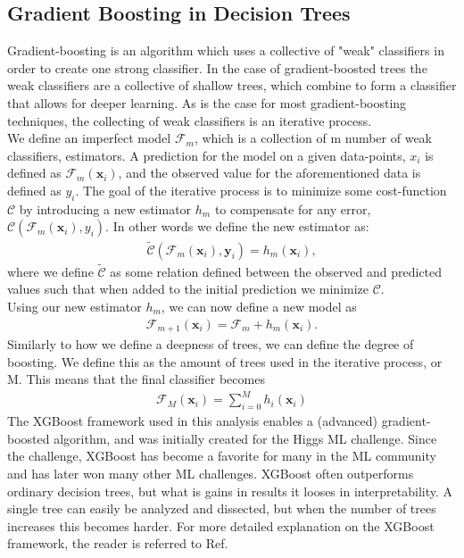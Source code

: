 \subsection{Gradient Boosting in Decision Trees}
Gradient-boosting is an algorithm which uses a collective of "weak" 
classifiers in order to create one strong classifier. In the case of gradient-boosted 
trees the weak classifiers are a collective of shallow trees, which combine to form a classifier 
that allows for deeper learning. As is the case for most gradient-boosting 
techniques, the collecting of weak classifiers is an iterative process.
\\
We define an imperfect model $\mathcal{F}_m$, which is a collection of m number of weak 
classifiers, estimators. A prediction for the model on a given data-points, $x_i$ is 
defined as $\mathcal{F}_m(\textbf{x}_i)$, and the observed value for the aforementioned data is 
defined as $y_i$. The goal of the iterative process is to minimize some cost-function 
$\mathcal{C}$ by introducing a new estimator $h_m$ to compensate for any error, 
$\mathcal{C}(\mathcal{F}_m(\textbf{x}_i), y_i)$. In other words we define the new estimator as:
\begin{align}
    \tilde{\mathcal{C}}(\mathcal{F}_m(\textbf{x}_i), \textbf{y}_i) = h_m(\textbf{x}_i),
\end{align}
where we define $\tilde{\mathcal{C}}$ as some relation defined between the observed and 
predicted values such that when added to the initial prediction we minimize $\mathcal{C}$.
\\
Using our new estimator $h_m$, we can now define a new model as
\begin{align}
    \mathcal{F}_{m+1}(\textbf{x}_i) = \mathcal{F}_m + h_m (\textbf{x}_i).
\end{align}
Similarly to how we define a deepness of trees, we can define the degree of boosting. We define 
this as the amount of trees used in the iterative process, or M. This means that the final classifier 
becomes
\begin{align}
    \mathcal{F}_M (\textbf{x}_i) = \sum_{i=0}^M h_i(\textbf{x}_i)
\end{align} 
The XGBoost \cite{XGB} framework used in this analysis enables a (advanced) gradient-boosted algorithm, 
and was initially created for the Higgs ML challenge. Since the challenge, XGBoost has become 
a favorite for many in the ML community and has later won many other ML challenges. XGBoost 
often outperforms ordinary decision trees, but what is gains in results it looses in 
interpretability. A single tree can easily be analyzed and dissected, but when the number 
of trees increases this becomes harder. For more detailed explanation on the XGBoost framework,
the reader is referred to Ref.\cite{XGB}